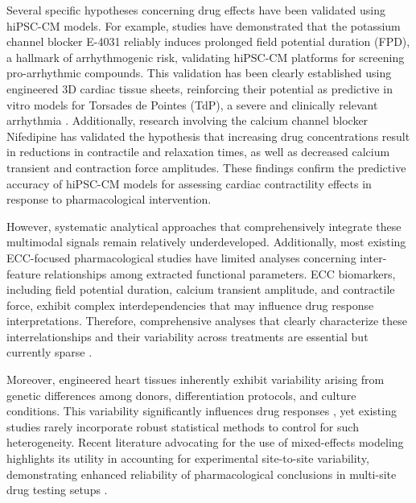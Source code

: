 \documentclass{report}
\begin{document}
    Several specific hypotheses concerning drug effects have been validated using hiPSC-CM models. For example, studies have demonstrated that the potassium channel blocker E-4031 reliably induces prolonged field potential duration (FPD), a hallmark of arrhythmogenic risk, validating hiPSC-CM platforms for screening pro-arrhythmic compounds. This validation has been clearly established using engineered 3D cardiac tissue sheets, reinforcing their potential as predictive in vitro models for Torsades de Pointes (TdP), a severe and clinically relevant arrhythmia \cite{Kawatou2017-gh}. Additionally, research involving the calcium channel blocker Nifedipine has validated the hypothesis that increasing drug concentrations result in reductions in contractile and relaxation times, as well as decreased calcium transient and contraction force amplitudes\cite{Min2024-nc}. These findings confirm the predictive accuracy of hiPSC-CM models for assessing cardiac contractility effects in response to pharmacological intervention.
    
    However, systematic analytical approaches that comprehensively integrate these multimodal signals remain relatively underdeveloped. Additionally, most existing ECC-focused pharmacological studies have limited analyses concerning inter-feature relationships among extracted functional parameters. ECC biomarkers, including field potential duration, calcium transient amplitude, and contractile force, exhibit complex interdependencies that may influence drug response interpretations. Therefore, comprehensive analyses that clearly characterize these interrelationships and their variability across treatments are essential but currently sparse \cite{Blinova2018-wo}.
    
    Moreover, engineered heart tissues inherently exhibit variability arising from genetic differences among donors, differentiation protocols, and culture conditions. This variability significantly influences drug responses \cite{Gintant2019-sr}, yet existing studies rarely incorporate robust statistical methods to control for such heterogeneity. Recent literature advocating for the use of mixed-effects modeling highlights its utility in accounting for experimental site-to-site variability, demonstrating enhanced reliability of pharmacological conclusions in multi-site drug testing setups \cite{Blinova2018-wo}.
    
\end{document}
